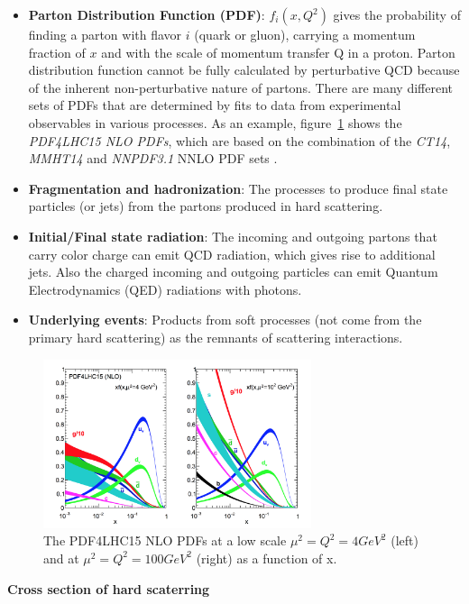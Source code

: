 \begin{itemize}
	\item \textbf{Parton Distribution Function (PDF)}: $f_{i}\left(x, Q^{2}\right)$ gives the probability of finding a parton with flavor $i$ (quark or gluon), carrying a momentum fraction of $x$ and with the scale of momentum transfer Q in a proton. Parton distribution function cannot be fully calculated by perturbative QCD because of the inherent non-perturbative nature of partons. There are many different sets of PDFs that are determined by fits to data from experimental observables in various processes. As an example, figure~\ref{fig:C2_PDF4LHC15} shows the \textit{PDF4LHC15 NLO PDFs}, which are based on the combination of the \textit{CT14}, \textit{MMHT14} and \textit{NNPDF3.1} NNLO PDF sets \cite{Lin:2017snn}.
	\item \textbf{Fragmentation and hadronization}: The processes to produce final state particles (or jets) from the partons produced in hard scattering.
	\item \textbf{Initial/Final state radiation}: The incoming and outgoing partons that carry color charge can emit QCD radiation, which gives rise to additional jets. Also the charged incoming and outgoing particles can emit Quantum Electrodynamics (QED) radiations with photons.
	\item \textbf{Underlying events}: Products from soft processes (not come from the primary hard scattering) as the remnants of scattering interactions.
\end{itemize}
\begin{figure}[!htb]
  \centering
  \includegraphics[width=0.7\textwidth]{figures/Theory/PDF4LHC15.png}
  \caption{The PDF4LHC15 NLO PDFs at a low scale $\mu^{2} = Q^{2} = 4 GeV^{2}$ (left) and at $\mu^{2} = Q^{2} = 100 GeV^{2}$ (right) as a function of x.}
  \label{fig:C2_PDF4LHC15}
\end{figure}

\textbf{Cross section of hard scaterring} 

